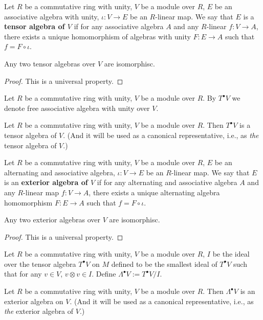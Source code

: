 \begin{definition}
  Let
    $R$ be a commutative ring with unity,
    $V$ be a module over $R$,
    $E$ be an associative algebra with unity,
    $\iota \colon V \to E$ be an $R$-linear map.
  We say that $E$ is a \textbf{tensor algebra of $V$} if for any associative
  algebra $A$ and any $R$-linear $f \colon V \to A$,
  there exists a unique homomorphism of algebras with unity
  $F \colon E \to A$ such that $f = F \circ \iota$.
\end{definition}
\begin{proposition}
  Any two tensor algebras over $V$ are isomorphisc.
\end{proposition}
\begin{proof}
  This is a universal property.
\end{proof}
\begin{notation}
  Let
    $R$ be a commutative ring with unity,
    $V$ be a module over $R$.
  By $T^\bullet V$  we denote free associative algebra with unity over $V$.
\end{notation}
\begin{proposition}
  Let
    $R$ be a commutative ring with unity,
    $V$ be a module over $R$.
  Then $T^\bullet V$ is a tensor algebra of $V$.
  (And it will be used as a canonical representative, i.e., as
  \emph{the} tensor algebra of $V$.)
\end{proposition}
\begin{definition}
  Let
    $R$ be a commutative ring with unity,
    $V$ be a module over $R$,
    $E$ be an alternating and associative algebra,
    $\iota \colon V \to E$ be an $R$-linear map.
  We say that $E$ is an \textbf{exterior algebra of $V$} if for any alternating
  and associative algebra $A$ and any $R$-linear map $f \colon V \to A$,
  there exists a unique alternating algebra homomorphism
  $F \colon E \to A$ such that $f = F \circ \iota$.
\end{definition}
\begin{proposition}
  Any two exterior algebras over $V$ are isomorphisc.
\end{proposition}
\begin{proof}
  This is a universal property.
\end{proof}
\begin{notation}
  Let
    $R$ be a commutative ring with unity,
    $V$ be a module over $R$,
    $I$ be the ideal over the tensor algebra $T^\bullet V$ on $M$ defined to be
    the smallest ideal of $T^\bullet V$ such that for any $v \in V$,
    $v \otimes v \in I$.
  Define $\Lambda^\bullet V := T^\bullet V / I$.
\end{notation}
\begin{proposition}
  Let
    $R$ be a commutative ring with unity,
    $V$ be a module over $R$.
  Then $\Lambda^\bullet V$ is an exterior algebra on $V$.
  (And it will be used as a canonical representative, i.e., as
  \emph{the} exterior algebra of $V$.)
\end{proposition}
